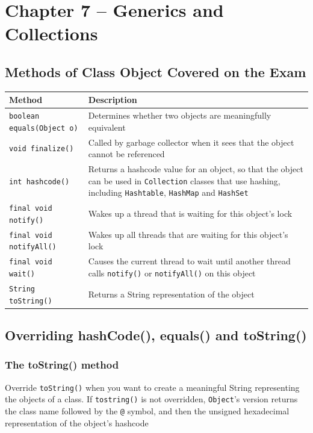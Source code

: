 \section{Chapter 7 -- Generics and Collections}
\subsection{Methods of Class Object Covered on the Exam}
\begin{center}
\begin{tabular}{lp{}}
    \textbf{Method} & \textbf{Description} \\
    \hline
    \verb#boolean equals(Object o)# & Determines whether two objects are 
    meaningfully equivalent \\
    \verb#void finalize()# & Called by garbage collector when it sees that the 
    object cannot be referenced \\
    \verb#int hashcode()# & Returns a hashcode value for an object, so that the 
    object can be used in \verb#Collection# classes that use hashing, including 
    \verb#Hashtable#, \verb#HashMap# and \verb#HashSet# \\
    \verb#final void notify()# & Wakes up a thread that is waiting for this 
    object's lock \\
    \verb#final void notifyAll()# & Wakes up all threads that are waiting for 
    this object's lock \\
    \verb#final void wait()# &  Causes the current thread to wait until another 
    thread calls \verb#notify()# or \verb#notifyAll()# on this object \\
    \verb#String toString()# & Returns a String representation of the object \\
\end{tabular}
\end{center}

\subsection{Overriding hashCode(), equals() and toString()}
\subsubsection{The toString() method}
Override \verb#toString()# when you want to create a meaningful String 
representing the objects of a class. If \verb#tostring()# is not overridden, 
\verb#Object#'s version returns the class name followed by the \verb#@# symbol, 
and then the unsigned hexadecimal representation of the object's hashcode

